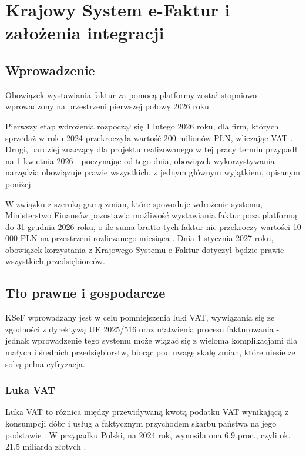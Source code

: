 \chapter{Krajowy System e-Faktur i założenia integracji}
\section{Wprowadzenie}
Obowiązek wystawiania faktur za pomocą platformy został stopniowo wprowadzony na przestrzeni pierwszej połowy 2026 roku \parencite{ministerstwo_finansow_pytania_2025}. 

Pierwszy etap wdrożenia rozpoczął się 1 lutego 2026 roku, dla firm, których sprzedaż w roku 2024 przekroczyła wartość 200 milionów PLN, wliczając VAT \parencite{ministerstwo_finansow_terminy_2025}. Drugi, bardziej znaczący dla projektu realizowanego w tej pracy termin przypadł na 1 kwietnia 2026 \parencite{ministerstwo_finansow_terminy_2025} - poczynając od tego dnia, obowiązek wykorzystywania narzędzia obowiązuje prawie wszystkich, z jednym głównym wyjątkiem, opisanym poniżej.

W związku z szeroką gamą zmian, które spowoduje wdrożenie systemu, Ministerstwo Finansów pozostawia możliwość wystawiania faktur poza platformą do 31 grudnia 2026 roku, o ile suma brutto tych faktur nie przekroczy wartości 10 000 PLN na przestrzeni rozliczanego miesiąca \parencite{ministerstwo_finansow_zakres_2025}. Dnia 1 stycznia 2027 roku, obowiązek korzystania z Krajowego Systemu e-Faktur dotyczył będzie prawie wszystkich przedsiębiorców.

\section{Tło prawne i gospodarcze}
KSeF wprowadzany jest w celu pomniejszenia luki VAT, wywiązania się ze zgodności z dyrektywą UE 2025/516 oraz ułatwienia procesu fakturowania \parencite{ministerstwo_finansow_pytania_2025,vida_council_2025} - jednak wprowadzenie tego systemu może wiązać się z wieloma komplikacjami dla małych i średnich przedsiębiorstw, biorąc pod uwagę skalę zmian, które niesie ze sobą pełna cyfryzacja.

\subsection{Luka VAT}
Luka VAT to różnica między przewidywaną kwotą podatku VAT wynikającą z konsumpcji dóbr i usług a faktycznym przychodem skarbu państwa na jego podstawie \parencite{mf_raport_luka_2019}. W przypadku Polski, na 2024 rok, wynosiła ona 6,9 proc., czyli ok. 21,5 miliarda złotych \parencite{mf_wiadomosci_luka_2024}.

